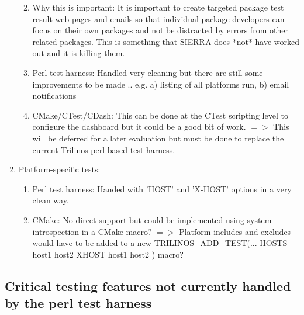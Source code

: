 \documentclass[pdf,ps2pdf,11pt]{SANDreport}
\begin{document}
\begin{enumerate}
  \begin{enumerate}

  {}\item Why this is important: It is important to create targeted
  package test result web pages and emails so that individual
  package developers can focus on their own packages and not be
  distracted by errors from other related packages.  This is
  something that SIERRA does *not* have worked out and it is killing
  them.

  {}\item Perl test harness: Handled very cleaning but there are
  still some improvements to be made .. e.g. a) listing of all
  platforms run, b) email notifications

  {}\item CMake/CTest/CDash: This can be done at the CTest scripting
  level to configure the dashboard but it could be a good bit of
  work. $=>$ This will be deferred for a later evaluation but must
  be done to replace the current Trilinos perl-based test harness.

  \end{enumerate}

{}\item Platform-specific tests:

  \begin{enumerate}

  {}\item Perl test harness: Handed with 'HOST' and 'X-HOST' options
  in a very clean way.

  {}\item CMake: No direct support but could be implemented using
  system introspection in a CMake macro?  $=>$ Platform includes and
  excludes would have to be added to a new TRILINOS\_ADD\_TEST(...
  HOSTS host1 host2 XHOST host1 host2 ) macro?

  \end{enumerate}

\end{enumerate}

%
{}\subsection{Critical testing features not currently handled by the perl
test harness}
%
\end{document}
